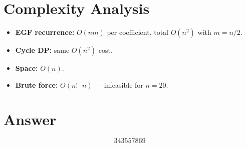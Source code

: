 \documentclass[11pt]{article}
\begin{document}
\section{Complexity Analysis}

\begin{itemize}
\item \textbf{EGF recurrence:} $O(nm)$ per coefficient, total $O(n^2)$ with $m = n/2$.
\item \textbf{Cycle DP:} same $O(n^2)$ cost.
\item \textbf{Space:} $O(n)$.
\item \textbf{Brute force:} $O(n! \cdot n)$ --- infeasible for $n = 20$.
\end{itemize}

\section{Answer}

\[
\boxed{343557869}
\]
\end{document}
